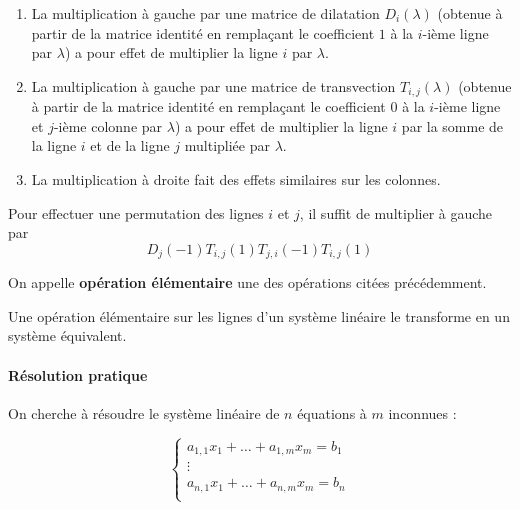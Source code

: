   \begin{theorem}
    \begin{enumerate}[label={\bfseries(\roman*)}]
      \item La multiplication à gauche par une matrice de dilatation $D_i(\lambda)$ (obtenue à partir de la matrice identité en remplaçant le coefficient $1$ à la $i$-ième ligne par $\lambda$) a pour effet de multiplier la ligne $i$ par $\lambda$.
      \item La multiplication à gauche par une matrice de transvection $T_{i,j}(\lambda)$ (obtenue à partir de la matrice identité en remplaçant le coefficient $0$ à la $i$-ième ligne et $j$-ième colonne par $\lambda$) a pour effet de multiplier la ligne $i$ par la somme de la ligne $i$ et de la ligne $j$ multipliée par $\lambda$.
      \item La multiplication à droite fait des effets similaires sur les colonnes.
    \end{enumerate}
  \end{theorem}

  \begin{remark}
    Pour effectuer une permutation des lignes $i$ et $j$, il suffit de multiplier à gauche par
    \[ D_j(-1)T_{i,j}(1)T_{j,i}(-1)T_{i,j}(1) \]
  \end{remark}

  \begin{definition}
    On appelle \textbf{opération élémentaire} une des opérations citées précédemment.
  \end{definition}

  \begin{theorem}
    Une opération élémentaire sur les lignes d'un système linéaire le transforme en un système équivalent.
  \end{theorem}

  \paragraph{Résolution pratique}

  On cherche à résoudre  le système linéaire de $n$ équations à $m$ inconnues :

  \[
  \begin{cases}
    a_{1,1} x_1 + \dots + a_{1,m} x_m = b_1 \\
    \vdots \\
    a_{n,1} x_1 + \dots + a_{n,m} x_m = b_n \\
  \end{cases}
  \tag{$S$}
  \]

